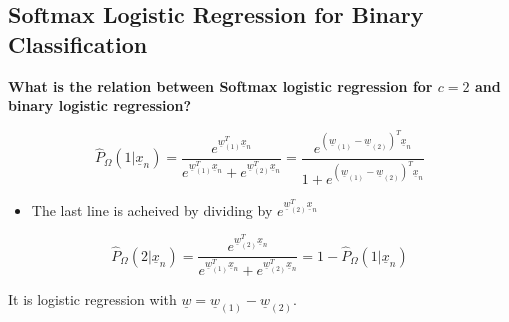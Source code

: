 \subsection{Softmax Logistic Regression for Binary Classification}
\begin{intuition}
    \textbf{What is the relation between Softmax logistic regression for \( c = 2 \) and binary logistic regression?}

    \[
    \hat{P}_{\Omega}(1 | \underline{x}_n) = \frac{e^{\underline{w}_{(1)}^T \underline{x}_n}}{e^{\underline{w}_{(1)}^T \underline{x}_n} + e^{\underline{w}_{(2)}^T \underline{x}_n}} = \frac{e^{(\underline{w}_{(1)} - \underline{w}_{(2)})^T \underline{x}_n}}{1 + e^{(\underline{w}_{(1)} - \underline{w}_{(2)})^T \underline{x}_n}}
    \]
    \begin{itemize}
        \item The last line is acheived by dividing by $e^{\underline{w}_{(2)}^T \underline{x}_n}$
    \end{itemize}

    \[
    \hat{P}_{\Omega}(2 | \underline{x}_n) = \frac{e^{\underline{w}_{(2)}^T \underline{x}_n}}{e^{\underline{w}_{(1)}^T \underline{x}_n} + e^{\underline{w}_{(2)}^T \underline{x}_n}} = 1 - \hat{P}_{\Omega}(1 | \underline{x}_n)
    \]

    It is logistic regression with \( \underline{w} = \underline{w}_{(1)} - \underline{w}_{(2)} \).
\end{intuition}

